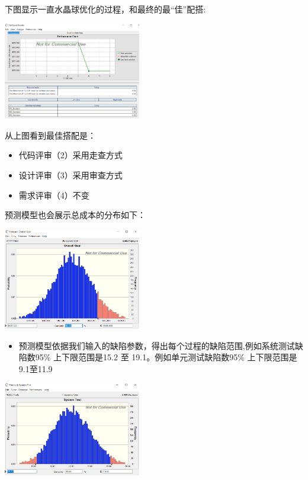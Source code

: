 下图显示一直水晶球优化的过程，和最终的最``佳''配搭:


\includegraphics[width=6cm]{YH.PNG}

从上图看到最佳搭配是：

\begin{itemize}
\tightlist
\item
  代码评审（2）采用走查方式
\item
  设计评审（3）采用审查方式
\item
  需求评审（4）不变
\end{itemize}

预测模型也会展示总成本的分布如下：

\includegraphics[width=6cm]{YH-OG.PNG}

\begin{itemize}
\tightlist
\item
  预测模型依据我们输入的缺陷参数，得出每个过程的缺陷范围,例如系统测试缺陷数95\%
  上下限范围是15.2 至 19.1。例如单元测试缺陷数95\% 上下限范围是9.1至11.9
\end{itemize}

\includegraphics[width=6cm]{YH-ST.PNG}

